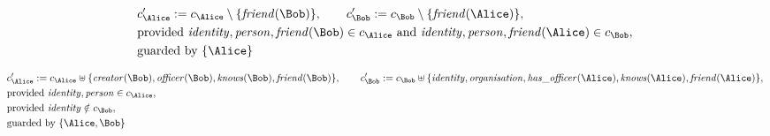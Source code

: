 \begin{align*}
&
c'_
{
\Alice
}
 := 
c_
{
\Alice
}
 \setminus 
\{
\mathit{\detokenize{
friend
}}
(
\Bob
)
\}
, \qquad 
c'_
{
\Bob
}
 := 
c_
{
\Bob
}
 \setminus 
\{
\mathit{\detokenize{
friend
}}
(
\Alice
)
\}
,\\
&
\text{provided } 
\mathit{\detokenize{
identity
}}
,
\mathit{\detokenize{
person
}}
,
\mathit{\detokenize{
friend
}}
(
\Bob
)
 \in c_
{
\Alice
}
 \text{ and } 
\mathit{\detokenize{
identity
}}
,
\mathit{\detokenize{
person
}}
,
\mathit{\detokenize{
friend
}}
(
\Alice
)
 \in c_
{
\Bob
}
,\\
&
\text{guarded by } \{
\Alice
\}
\end{align*}

\begin{align*}
&
c'_
{
\Alice
}
 := 
c_
{
\Alice
}
 \uplus 
\{
\mathit{\detokenize{
creator
}}
(
\Bob
)
,
\mathit{\detokenize{
officer
}}
(
\Bob
)
,
\mathit{\detokenize{
knows
}}
(
\Bob
)
,
\mathit{\detokenize{
friend
}}
(
\Bob
)
\}
, \qquad 
c'_
{
\Bob
}
 := 
c_
{
\Bob
}
 \uplus 
\{
\mathit{\detokenize{
identity
}}
,
\mathit{\detokenize{
organisation
}}
,
\mathit{\detokenize{
has_officer
}}
(
\Alice
)
,
\mathit{\detokenize{
knows
}}
(
\Alice
)
,
\mathit{\detokenize{
friend
}}
(
\Alice
)
\}
,\\
&
\text{provided } 
\mathit{\detokenize{
identity
}}
,
\mathit{\detokenize{
person
}}
 \in c_
{
\Alice
}
,\\
&
\text{provided } 
\mathit{\detokenize{
identity
}}
 \notin c_
{
\Bob
}
,\\
&
\text{guarded by } \{
\Alice
,
\Bob
\}
\end{align*}

